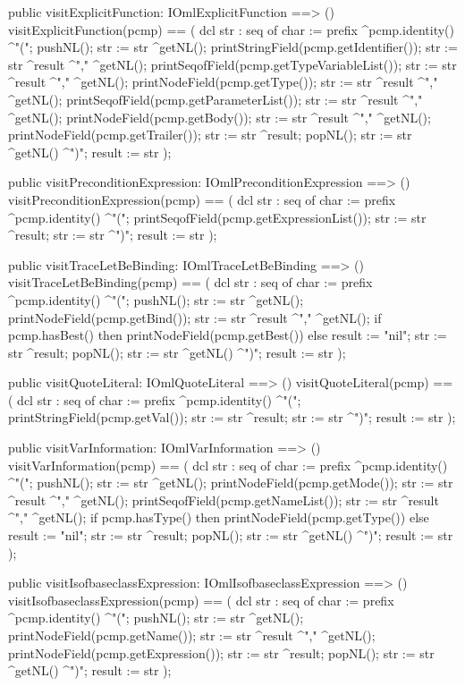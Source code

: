 \begin{vdm_al}
  public visitExplicitFunction: IOmlExplicitFunction ==> ()
  visitExplicitFunction(pcmp) ==
    ( dcl str : seq of char := prefix ^pcmp.identity() ^"(";
      pushNL();
      str := str ^getNL();
      printStringField(pcmp.getIdentifier());
      str := str ^result ^"," ^getNL();
      printSeqofField(pcmp.getTypeVariableList());
      str := str ^result ^"," ^getNL();
      printNodeField(pcmp.getType());
      str := str ^result ^"," ^getNL();
      printSeqofField(pcmp.getParameterList());
      str := str ^result ^"," ^getNL();
      printNodeField(pcmp.getBody());
      str := str ^result ^"," ^getNL();
      printNodeField(pcmp.getTrailer());
      str := str ^result;
      popNL();
      str := str ^getNL() ^")";
      result := str );

  public visitPreconditionExpression: IOmlPreconditionExpression ==> ()
  visitPreconditionExpression(pcmp) ==
    ( dcl str : seq of char := prefix ^pcmp.identity() ^"(";
      printSeqofField(pcmp.getExpressionList());
      str := str ^result;
      str := str ^")";
      result := str );

  public visitTraceLetBeBinding: IOmlTraceLetBeBinding ==> ()
  visitTraceLetBeBinding(pcmp) ==
    ( dcl str : seq of char := prefix ^pcmp.identity() ^"(";
      pushNL();
      str := str ^getNL();
      printNodeField(pcmp.getBind());
      str := str ^result ^"," ^getNL();
      if pcmp.hasBest()
      then printNodeField(pcmp.getBest())
      else result := "nil";
      str := str ^result;
      popNL();
      str := str ^getNL() ^")";
      result := str );

  public visitQuoteLiteral: IOmlQuoteLiteral ==> ()
  visitQuoteLiteral(pcmp) ==
    ( dcl str : seq of char := prefix ^pcmp.identity() ^"(";
      printStringField(pcmp.getVal());
      str := str ^result;
      str := str ^")";
      result := str );

  public visitVarInformation: IOmlVarInformation ==> ()
  visitVarInformation(pcmp) ==
    ( dcl str : seq of char := prefix ^pcmp.identity() ^"(";
      pushNL();
      str := str ^getNL();
      printNodeField(pcmp.getMode());
      str := str ^result ^"," ^getNL();
      printSeqofField(pcmp.getNameList());
      str := str ^result ^"," ^getNL();
      if pcmp.hasType()
      then printNodeField(pcmp.getType())
      else result := "nil";
      str := str ^result;
      popNL();
      str := str ^getNL() ^")";
      result := str );

  public visitIsofbaseclassExpression: IOmlIsofbaseclassExpression ==> ()
  visitIsofbaseclassExpression(pcmp) ==
    ( dcl str : seq of char := prefix ^pcmp.identity() ^"(";
      pushNL();
      str := str ^getNL();
      printNodeField(pcmp.getName());
      str := str ^result ^"," ^getNL();
      printNodeField(pcmp.getExpression());
      str := str ^result;
      popNL();
      str := str ^getNL() ^")";
      result := str );


\end{vdm_al}
